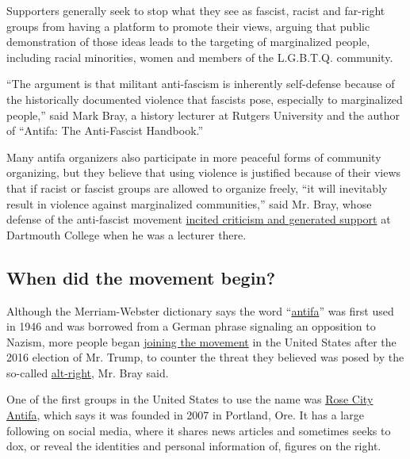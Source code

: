 Supporters generally seek to stop what they see as fascist, racist and
far-right groups from having a platform to promote their views, arguing
that public demonstration of those ideas leads to the targeting of
marginalized people, including racial minorities, women and members of
the L.G.B.T.Q. community.

``The argument is that militant anti-fascism is inherently self-defense
because of the historically documented violence that fascists pose,
especially to marginalized people,'' said Mark Bray, a history lecturer
at Rutgers University and the author of ``Antifa: The Anti-Fascist
Handbook.''

Many antifa organizers also participate in more peaceful forms of
community organizing, but they believe that using violence is justified
because of their views that if racist or fascist groups are allowed to
organize freely, ``it will inevitably result in violence against
marginalized communities,'' said Mr. Bray, whose defense of the
anti-fascist movement
\href{https://www.thedartmouth.com/article/2017/09/dartmouth-and-lecturer-mark-bray-at-center-of-antifa-violence-dispute}{incited
criticism and generated support} at Dartmouth College when he was a
lecturer there.

\hypertarget{when-did-the-movement-begin}{%
\subsection{When did the movement
begin?}\label{when-did-the-movement-begin}}

Although the Merriam-Webster dictionary says the word
``\href{https://www.merriam-webster.com/dictionary/antifa}{antifa}'' was
first used in 1946 and was borrowed from a German phrase signaling an
opposition to Nazism, more people began
\href{https://www.nytimes3xbfgragh.onion/2017/08/17/us/antifa-left-wing-faction-far-right.html}{joining
the movement} in the United States after the 2016 election of Mr. Trump,
to counter the threat they believed was posed by the so-called
\href{https://www.nytimes3xbfgragh.onion/2017/08/15/us/politics/alt-left-alt-right-glossary.html}{alt-right},
Mr. Bray said.

One of the first groups in the United States to use the name was
\href{https://www.wweek.com/news/2017/05/23/white-supremacists-are-brawling-with-masked-leftists-in-the-portland-streets-homeland-security-is-watching/}{Rose
City Antifa}, which says it was founded in 2007 in Portland, Ore. It has
a large following on social media, where it shares news articles and
sometimes seeks to dox, or reveal the identities and personal
information of, figures on the right.

